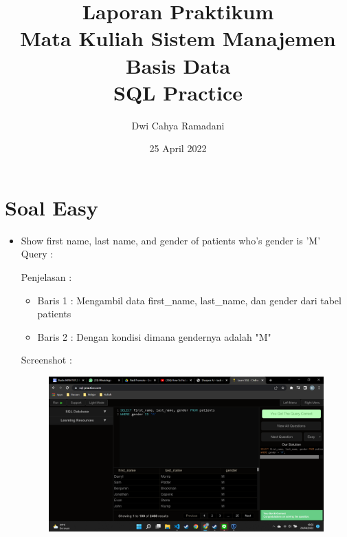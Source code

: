 \documentclass[]{article}
\title{Laporan Praktikum\\Mata Kuliah Sistem Manajemen Basis Data\\SQL Practice}
\author{Dwi Cahya Ramadani}
\date{25 April 2022}
\begin{document}
\maketitle

\section{Soal Easy}
    \begin{itemize}
        \item Show first name, last name, and gender of patients who's gender is 'M'
        \\Query : 
        
        Penjelasan :
        \begin{itemize}
            \item Baris 1 : Mengambil data first\_name, last\_name, dan gender dari tabel patients
            \item Baris 2 : Dengan kondisi dimana gendernya adalah "M"
        \end{itemize}
        Screenshot :
        \begin{figure}[h]
            \includegraphics[scale=0.3]{./Screenshot/Easy-1.png}
            \centering
        \end{figure}


\end{itemize}
\end{document}

